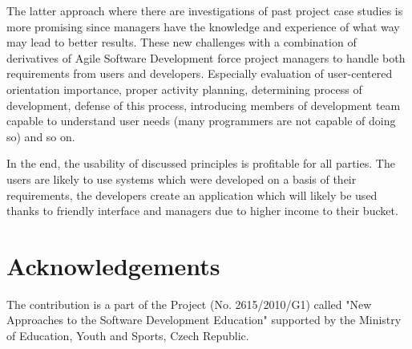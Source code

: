\documentclass[graybox]{svmult}
\begin{document}
The latter approach where there are investigations of past project case
studies is more promising since managers have the knowledge and experience
of what way may lead to better results. These new challenges with a combination
of derivatives of Agile Software Development force project managers to handle
both requirements from users and developers. Especially evaluation of
user-centered orientation importance, proper activity planning, determining
process of development, defense of this process, introducing members of
development team capable to understand user needs (many programmers are not
capable of doing so) and so on.

In the end, the usability of discussed principles is profitable for all
parties. The users are likely to use systems which were developed on a basis
of their requirements, the developers create an application which will likely
be used thanks to friendly interface and managers due to higher income to
their bucket.

\section*{Acknowledgements}
The contribution is a part of the Project (No. 2615/2010/G1) called "New
Approaches to the Software Development Education" supported by the Ministry of
Education, Youth and Sports, Czech Republic.



\end{document}
